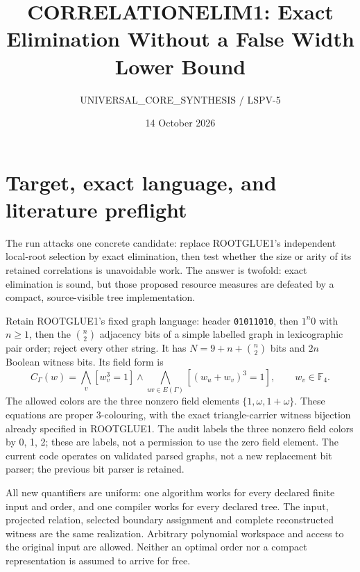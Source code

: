 \documentclass[11pt]{article}
\title{CORRELATIONELIM1: Exact Elimination Without a False Width Lower Bound}
\author{UNIVERSAL\_CORE\_SYNTHESIS / LSPV-5}
\date{14 October 2026}
\newcommand{\C}{\{1,\omega,1+\omega\}}
\newcommand{\F}{\mathbb F}
\begin{document}
\maketitle
\begin{center}
\end{center}

\section{Target, exact language, and literature preflight}
The run attacks one concrete candidate: replace ROOTGLUE1's independent
local-root selection by exact elimination, then test whether the size or arity
of its retained correlations is unavoidable work. The answer is twofold:
exact elimination is sound, but those proposed resource measures are defeated
by a compact, source-visible tree implementation.

Retain ROOTGLUE1's fixed graph language: header \texttt{01011010}, then
$1^n0$ with $n\ge1$, then the $\binom n2$ adjacency bits of a simple labelled
graph in lexicographic pair order; reject every other string. It has
$N=9+n+\binom n2$ bits and $2n$ Boolean witness bits. Its field form is
\[
 C_\Gamma(w)=\bigwedge_v[w_v^3=1]\land
 \bigwedge_{uv\in E(\Gamma)}[(w_u+w_v)^3=1],
 \qquad w_v\in\F_4.
\]
The allowed colors are the three nonzero field elements $\C$. These equations
are proper 3-colouring, with the exact triangle-carrier witness bijection
already specified in ROOTGLUE1. The audit labels the three nonzero field colors by 0, 1, 2; these are
labels, not a permission to use the zero field element. The current code
operates on validated parsed graphs, not a new replacement bit parser; the previous bit parser is retained.

All new quantifiers are uniform: one algorithm works for every declared
finite input and order, and one compiler works for every declared tree.
The input, projected relation, selected boundary assignment and complete
reconstructed witness are the same realization. Arbitrary polynomial
workspace and access to the original input are allowed. Neither an optimal
order nor a compact representation is assumed to arrive for free.
\end{document}
